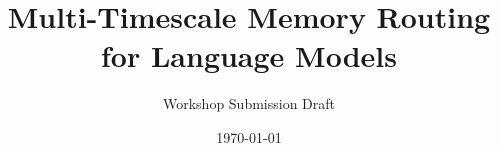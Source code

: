 \documentclass[11pt]{article}
\title{Multi-Timescale Memory Routing for Language Models}
\author{Workshop Submission Draft}
\date{\today}
\begin{document}
\maketitle

\begin{abstract}

\end{abstract}




\end{document}
